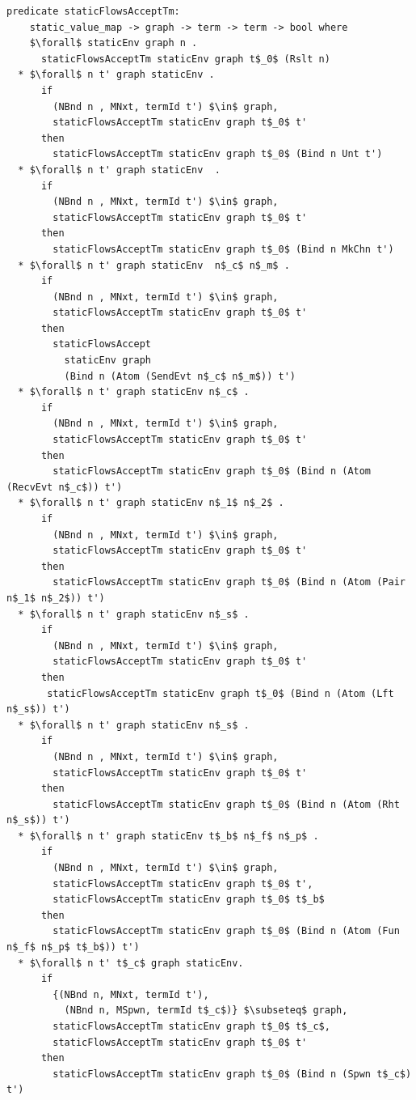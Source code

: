 \documentclass[letterpaper, 11pt]{extarticle}
\begin{document}
\begin{lstlisting}[language=logic, mathescape]
  predicate staticFlowsAcceptTm:
    static_value_map -> graph -> term -> term -> bool where
    $\forall$ staticEnv graph n .
      staticFlowsAcceptTm staticEnv graph t$_0$ (Rslt n)
  * $\forall$ n t' graph staticEnv .
      if
        (NBnd n , MNxt, termId t') $\in$ graph,
        staticFlowsAcceptTm staticEnv graph t$_0$ t'
      then
        staticFlowsAcceptTm staticEnv graph t$_0$ (Bind n Unt t')
  * $\forall$ n t' graph staticEnv  .
      if
        (NBnd n , MNxt, termId t') $\in$ graph,
        staticFlowsAcceptTm staticEnv graph t$_0$ t'
      then
        staticFlowsAcceptTm staticEnv graph t$_0$ (Bind n MkChn t')
  * $\forall$ n t' graph staticEnv  n$_c$ n$_m$ .
      if
        (NBnd n , MNxt, termId t') $\in$ graph,
        staticFlowsAcceptTm staticEnv graph t$_0$ t'
      then
        staticFlowsAccept
          staticEnv graph
          (Bind n (Atom (SendEvt n$_c$ n$_m$)) t')
  * $\forall$ n t' graph staticEnv n$_c$ .
      if
        (NBnd n , MNxt, termId t') $\in$ graph,
        staticFlowsAcceptTm staticEnv graph t$_0$ t'
      then
        staticFlowsAcceptTm staticEnv graph t$_0$ (Bind n (Atom (RecvEvt n$_c$)) t')
  * $\forall$ n t' graph staticEnv n$_1$ n$_2$ .
      if
        (NBnd n , MNxt, termId t') $\in$ graph,
        staticFlowsAcceptTm staticEnv graph t$_0$ t'
      then
        staticFlowsAcceptTm staticEnv graph t$_0$ (Bind n (Atom (Pair n$_1$ n$_2$)) t')
  * $\forall$ n t' graph staticEnv n$_s$ .
      if
        (NBnd n , MNxt, termId t') $\in$ graph,
        staticFlowsAcceptTm staticEnv graph t$_0$ t'
      then
       staticFlowsAcceptTm staticEnv graph t$_0$ (Bind n (Atom (Lft n$_s$)) t')
  * $\forall$ n t' graph staticEnv n$_s$ .
      if
        (NBnd n , MNxt, termId t') $\in$ graph,
        staticFlowsAcceptTm staticEnv graph t$_0$ t'
      then
        staticFlowsAcceptTm staticEnv graph t$_0$ (Bind n (Atom (Rht n$_s$)) t')
  * $\forall$ n t' graph staticEnv t$_b$ n$_f$ n$_p$ .
      if
        (NBnd n , MNxt, termId t') $\in$ graph,
        staticFlowsAcceptTm staticEnv graph t$_0$ t',
        staticFlowsAcceptTm staticEnv graph t$_0$ t$_b$
      then
        staticFlowsAcceptTm staticEnv graph t$_0$ (Bind n (Atom (Fun n$_f$ n$_p$ t$_b$)) t')
  * $\forall$ n t' t$_c$ graph staticEnv.
      if
        {(NBnd n, MNxt, termId t'),
          (NBnd n, MSpwn, termId t$_c$)} $\subseteq$ graph,
        staticFlowsAcceptTm staticEnv graph t$_0$ t$_c$,
        staticFlowsAcceptTm staticEnv graph t$_0$ t'
      then
        staticFlowsAcceptTm staticEnv graph t$_0$ (Bind n (Spwn t$_c$) t')

\end{lstlisting}
\end{document}
